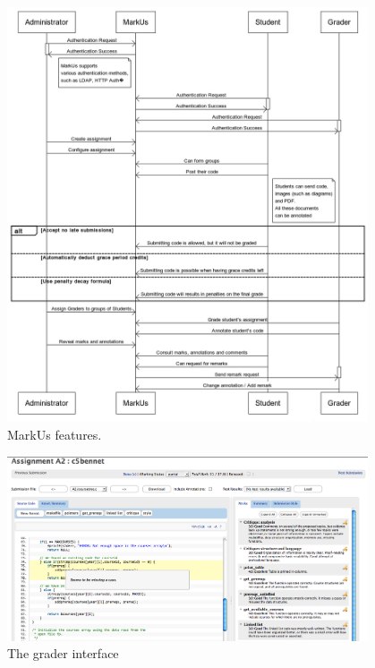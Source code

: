\documentclass[twocolumn,10pt]{asme2e}
\begin{document}
\begin{figure}[htbp]
	\centering
		\includegraphics[width=0.95\textwidth]{Diagrams/diagram.png}
	\caption{MarkUs features.}
	\label{fig:features}
\end{figure}

\begin{figure}[htbp]
	\centering
		\includegraphics[width=0.95\textwidth]{images/graderview.png}
	\caption{The grader interface}
	\label{fig:grader}
\end{figure}

\end{document}
